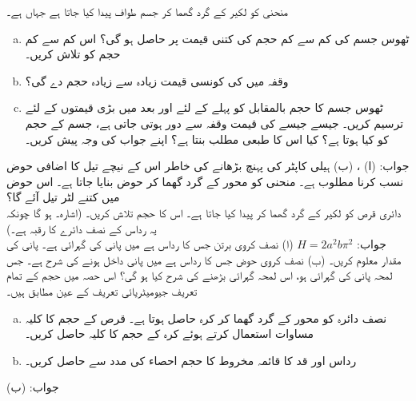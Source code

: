 منحنی  کو لکیر  کے گرد گھما کر جسم طواف پیدا کیا جاتا ہے جہاں  ہے۔
\begin{enumerate}[a.]
\item
ٹھوس جسم کی کم سے کم حجم  کی کتنی قیمت پر حاصل ہو گی؟ اس کم سے کم حجم کو تلاش کریں۔
\item
وقفہ  میں کی کونسی قیمت زیادہ سے زیادہ حجم دے گی؟
\item
ٹھوس جسم کا حجم بالمقابل  کو پہلے  کے لئے اور بعد میں بڑی قیمتوں کے لئے ترسیم کریں۔ جیسے جیسے   کی قیمت وقفہ  سے دور ہوتی جاتی ہے، جسم کے حجم کو کیا ہوتا ہے؟ کیا اس کا طبعی مطلب بنتا ہے؟ اپنے جواب کی وجہ پیش کریں۔
\end{enumerate}
جواب:\quad
(ا) ، (ب) 
ہیلی کاپٹر کی پہنچ  بڑھانے کی خاطر اس کے نیچے تیل کا اضافی حوض نسب کرنا مطلوب ہے۔ منحنی  کو  محور کے گرد گھما کر حوض بنایا جاتا ہے۔ اس حوض میں کتنے لٹر تیل آئے گا؟
\\
دائری قرص  کو لکیر  کے گرد گھما کر  پیدا کیا جاتا ہے۔ اس کا حجم تلاش کریں۔ (اشارہ۔  ہو گا چونکہ یہ رداس  کے نصف دائرے کا رقبہ ہے۔)\\
جواب:\quad
$H=2a^2b\pi^2$
(ا) نصف کروی برتن جس کا رداس  ہے میں پانی کی گہرائی  ہے۔ پانی کی مقدار معلوم کریں۔ (ب) نصف کروی حوض جس کا رداس  ہے میں پانی داخل ہونے کی شرح  ہے۔ جس لمحہ پانی کی گہرائی  ہو، اس لمحہ گہرائی بڑھنے کی شرح کیا ہو گی؟
اس حصہ میں حجم کے تمام تعریف جیومیٹریائی تعریف کے عین مطابق ہیں۔
\begin{enumerate}[a.]
\item
نصف دائرہ  کو  محور کے گرد گھما کر کرہ حاصل ہوتا ہے۔ قرص کے حجم کا کلیہ مساوات  استعمال کرتے ہوئے کرہ کے حجم کا کلیہ  حاصل کریں۔
\item
رداس  اور قد  کا قائمہ مخروط کا حجم احصاء کی مدد سے حاصل کریں۔
\end{enumerate}
جواب:\quad
(ب) 


